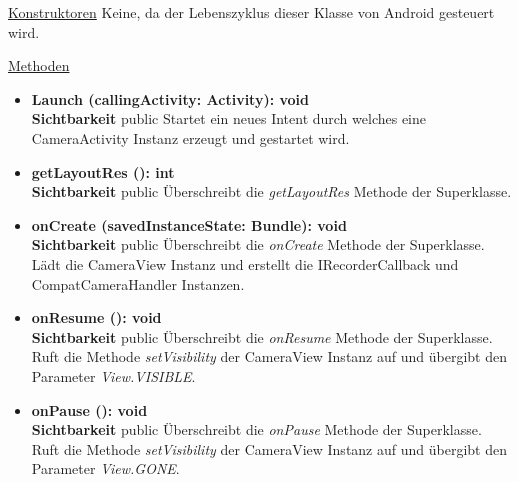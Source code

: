 \underline{Konstruktoren}\newline
\indent Keine, da der Lebenszyklus dieser Klasse von Android gesteuert wird.\newline

\underline{Methoden}
\begin{itemize}
\itemsep0pt

\item \textbf{Launch (callingActivity: Activity): void}\hfill\\
\textbf{Sichtbarkeit} public\newline
Startet ein neues Intent durch welches eine CameraActivity Instanz erzeugt und gestartet wird.

\item \textbf{getLayoutRes (): int}\hfill\\
\textbf{Sichtbarkeit} public\newline
Überschreibt die \textit{getLayoutRes} Methode der Superklasse.

\item \textbf{onCreate (savedInstanceState: Bundle): void}\hfill\\
\textbf{Sichtbarkeit} public\newline
Überschreibt die \textit{onCreate} Methode der Superklasse. Lädt die CameraView Instanz und erstellt die IRecorderCallback und CompatCameraHandler Instanzen.

\item \textbf{onResume (): void}\hfill\\
\textbf{Sichtbarkeit} public\newline
Überschreibt die \textit{onResume} Methode der Superklasse. Ruft die Methode \textit{setVisibility} der CameraView Instanz auf und übergibt den Parameter \textit{View.VISIBLE}.

\item \textbf{onPause (): void}\hfill\\
\textbf{Sichtbarkeit} public\newline
Überschreibt die \textit{onPause} Methode der Superklasse. Ruft die Methode \textit{setVisibility} der CameraView Instanz auf und übergibt den Parameter \textit{View.GONE}.

\end{itemize}